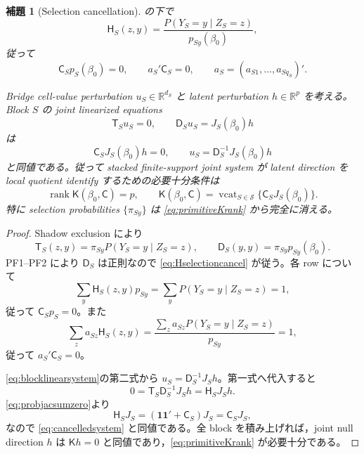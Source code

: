 \documentclass[11pt,a4paper]{ltjsarticle}
\newtheorem{lemma}{補題}[section]
\theoremstyle{remark}
\newcommand{\R}{\mathbb R}
\newcommand{\one}{\bm 1}
\newcommand{\cS}{\mathcal S}
\newcommand{\rank}{\operatorname{rank}}
\begin{document}
\begin{lemma}[Selection cancellation]\label{lem:selectioncancellation}
の下で
\begin{equation}
\mathsf H_S(z,y)
=\frac{P(Y_S=y\mid Z_S=z)}{p_{Sy}(\beta_0)},
\label{eq:Hselectioncancel}
\end{equation}
従って
\begin{equation}
\mathsf C_Sp_S(\beta_0)=0,
\qquad
a_S'\mathsf C_S=0,
\qquad
a_S=(a_{S1},\ldots,a_{Sq_S})'.
\label{eq:Cprobconstraints}
\end{equation}

Bridge cell-value perturbation $u_S\in\R^{d_S}$ と latent perturbation $h\in\R^p$ を考える。Block $S$ の joint linearized equations
\begin{equation}
\mathsf T_Su_S=0,
\qquad
\mathsf D_Su_S=J_S(\beta_0)h
\label{eq:blocklinearsystem}
\end{equation}
は
\begin{equation}
\mathsf C_SJ_S(\beta_0)h=0,
\qquad
u_S=\mathsf D_S^{-1}J_S(\beta_0)h
\label{eq:cancelledsystem}
\end{equation}
と同値である。従って stacked finite-support joint system が latent direction を local quotient identify するための必要十分条件は
\begin{equation}
\rank\mathsf K(\beta_0,\mathsf C)=p,
\qquad
\mathsf K(\beta_0,\mathsf C)
=\operatorname{vcat}_{S\in\cS}
\{\mathsf C_SJ_S(\beta_0)\}.
\label{eq:primitiveKrank}
\end{equation}
特に selection probabilities $\{\pi_{Sy}\}$ は \eqref{eq:primitiveKrank} から完全に消える。
\end{lemma}

\begin{proof}
Shadow exclusion により
\[
\mathsf T_S(z,y)
=\pi_{Sy}P(Y_S=y\mid Z_S=z),
\qquad
\mathsf D_S(y,y)=\pi_{Sy}p_{Sy}(\beta_0).
\]
PF1--PF2 により $\mathsf D_S$ は正則なので \eqref{eq:Hselectioncancel} が従う。各 row について
\[
\sum_y\mathsf H_S(z,y)p_{Sy}
=\sum_yP(Y_S=y\mid Z_S=z)=1,
\]
従って $\mathsf C_Sp_S=0$。また
\[
\sum_za_{Sz}\mathsf H_S(z,y)
=\frac{\sum_za_{Sz}P(Y_S=y\mid Z_S=z)}{p_{Sy}}=1,
\]
従って $a_S'\mathsf C_S=0$。

\eqref{eq:blocklinearsystem}の第二式から $u_S=\mathsf D_S^{-1}J_Sh$。第一式へ代入すると
\[
0=\mathsf T_S\mathsf D_S^{-1}J_Sh
=\mathsf H_SJ_Sh.
\]
\eqref{eq:probjacsumzero}より
\[
\mathsf H_SJ_S
=(\one\one'+\mathsf C_S)J_S
=\mathsf C_SJ_S,
\]
なので \eqref{eq:cancelledsystem} と同値である。全 block を積み上げれば，joint null direction $h$ は $\mathsf K h=0$ と同値であり，\eqref{eq:primitiveKrank} が必要十分である。
\end{proof}
\end{document}
